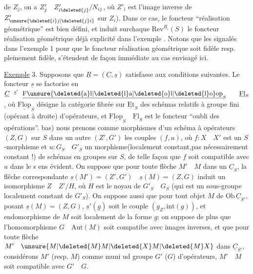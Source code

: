 de $Z_j$, on a $Z'_j\quad Z'_{i\deleted{j}}/N_{ij}$, où $Z'_i$ est l'image inverse de $Z'_{\unsure{\deleted{i}j|\deleted{j}i}}$ sur $Z_i$). Dans ce cas, le foncteur ``réalisation géométrique'' est bien défini, et induit surchaque $\mathrm{Rev}^{\underline{R}_i}(S)$ le foncteur réalisation géométrique déjà explicité dans l'exemple .  Notons que les  signalés dans l'exemple 1 pour que le foncteur réalisation géométrique soit fidèle resp. pleinement fidèle, s'étendent de façon immédiate au cas envisagé ici.

\uline{Exemple} 3. Supposons que $\underline{R}=(\underline{C},\underline{s})$ satisfasse aux conditions suivantes. Le foncteur $\underline{s}$ se factorise en $\underline{C}\overset{\underline{s}'}{\qquad}\underline{\mathrm{F\unsure{\deleted{a}l|\deleted{l}a|\deleted{o}l|\deleted{l}o}op}}_S\qquad\underline{\mathrm{Fl}}_S$, où $\underline{\mathrm{Flop}}_S$ désigne la catégorie fibrée sur $\underline{\mathrm{Et}}_S$ des schémas relatifs à groupe fini (opérant à droite) d'opérateurs, et $\underline{\mathrm{Flop}}_S\quad\underline{\mathrm{Fl}}_S$ est le foncteur ``oubli des opérations''.  bas) nous prenons comme morphismes d'un schéma à opérateurs $(Z,G)$ sur $S$ dans un autre $(Z',G')$ les couples $(f,u)$, où $f:X\quad X'$ est un $S$-morphisme et $u:G_S\quad G'_S$ un morphisme(localement constant,pas nécessairement constant !) de schémas en groupes sur $S$, de telle façon que $f$ soit compatible avec $u$ dans le s ens évident. On suppose que pour toute flèche $M'\quad M$ dans un $\underline{C}_S$,  la flêche correspondante $\underline{s}(M')=(Z',G')\quad\underline{s}(M)=(Z,G)$ induit un isomorphisme $Z\quad Z'/H$, où $H$ est le noyau de $G'_S\quad G_S$ (qui est un sous-groupe localement constant de $G'_S$). On suppose  aussi que pour tout objet $M$ de $\mathrm{Ob}\,\underline{C}_{S'}$, posant $\underline{s}(M)=(Z,G)$,  $\underline{s}'(\underline{g})$ soit le couple $(g_Z,\mathrm{int}(g))$, et  endomorphisme de $M$ soit localement de la forme $\underline{g}$; on  suppose de plus que  l'homomorphisme $G\quad\mathrm{Aut}(M)$ soit compatibe avec images inverses, et que pour toute flèche $M'\quad \unsure{M|\deleted{M}M|\deleted{X}M|\deleted{M}X}$ dans $\underline{C}_{S'}$, considérons $M'$ (resp. $M$) comme muni ud groupe $G'$ ($G$) d'opérateurs, $M'\quad M$ soit compatible avec $G'\quad G$.
